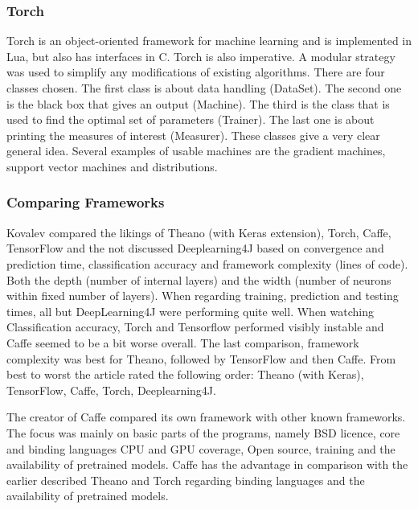 \documentclass[10pt,a4paper]{report}
\begin{document}
	\subsubsection{Torch}
	
	Torch is an object-oriented framework for machine learning and is 
	implemented in Lua, but also has interfaces in C. Torch is also 
	imperative.\cite{rampasek2016tensorflow} A modular strategy was used to 
	simplify any 
	modifications of existing algorithms. There are four classes chosen. The 
	first class is about data handling (DataSet). The second one is the black 
	box that gives an output (Machine). The third is the class that is used to 
	find the optimal set of parameters (Trainer). The last one is about 
	printing the measures of interest (Measurer). These classes give a very 
	clear general idea. Several examples of usable machines are the gradient 
	machines, support vector machines and distributions. 
	\cite{collobert2002torch}
	
	\subsubsection{Comparing Frameworks}
	
	Kovalev compared the likings of Theano (with Keras extension), Torch, 
	Caffe, TensorFlow and the not discussed Deeplearning4J based on convergence 
	and prediction time, classification accuracy and framework complexity 
	(lines of code). Both the depth (number of internal layers) and the width 
	(number of neurons within fixed number of layers). When regarding training, 
	prediction and testing times, all but DeepLearning4J were performing quite 
	well. When watching Classification accuracy, Torch and Tensorflow performed 
	visibly instable and Caffe seemed to be a bit worse overall. The last 
	comparison, framework complexity was best for Theano, followed by 
	TensorFlow and then Caffe. From best to worst the article rated the 
	following order: Theano (with Keras), TensorFlow, Caffe, Torch, 
	Deeplearning4J.	\cite{kovalev2016deep}
	
	The creator of Caffe compared its own framework with other known 
	frameworks. The focus was mainly on basic parts of the programs, namely BSD 
	licence, core and binding languages CPU and GPU coverage, Open source, 
	training and the availability of pretrained models. Caffe has the advantage 
	in comparison with the earlier described Theano and Torch regarding binding 
	languages and the availability of pretrained 
	models.\cite{DBLP:journals/corr/JiaSDKLGGD14}
	
\end{document}
